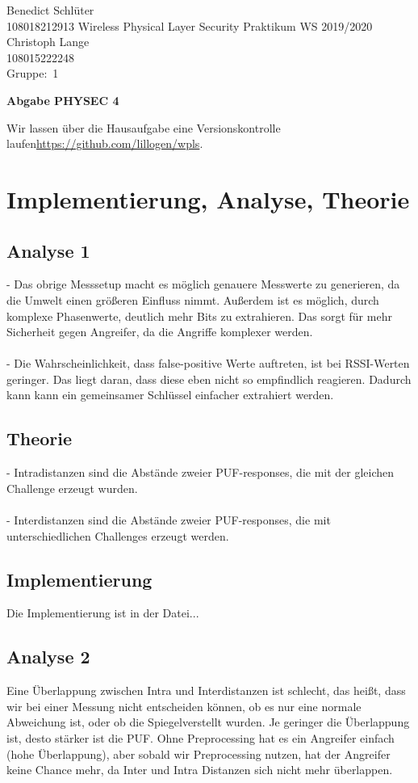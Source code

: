 \documentclass[12pt,a4paper]{article}
\newcommand{\student}{Benedict Schlüter\\ 108018212913 } %
\newcommand{\partner}{Christoph Lange\\ 108015222248} %
\newcommand{\group}{1} %
\newcommand{\hwheadtwo}{$ $
  \vspace{-2cm}
  
\noindent \student \qquad \qquad  Wireless Physical Layer Security Praktikum \hfill WS 2019/2020 \\
\noindent \partner \\
\noindent Gruppe:~\group\\
$ $

  
\begin{center}    
{\Large \bf Abgabe PHYSEC 4}
\end{center}
}
\begin{document}
\hwheadtwo
Wir lassen über die Hausaufgabe eine Versionskontrolle laufen\url{https://github.com/lillogen/wpls}.\\

\section{Implementierung, Analyse, Theorie}
\subsection*{Analyse 1}
- Das obrige Messsetup macht es möglich genauere Messwerte zu generieren, da die Umwelt einen größeren Einfluss nimmt. Außerdem ist es möglich, durch komplexe Phasenwerte, deutlich mehr Bits zu extrahieren. Das sorgt für mehr Sicherheit gegen Angreifer, da die Angriffe komplexer werden.\\\\
- Die Wahrscheinlichkeit, dass false-positive Werte auftreten, ist bei RSSI-Werten geringer. Das liegt daran, dass diese eben nicht so empfindlich reagieren. Dadurch kann kann ein gemeinsamer Schlüssel einfacher extrahiert werden. 
\subsection*{Theorie}
- Intradistanzen sind die Abstände zweier PUF-responses, die mit der gleichen Challenge erzeugt wurden.\\\\
- Interdistanzen sind die Abstände zweier PUF-responses, die mit unterschiedlichen Challenges erzeugt werden.
\subsection*{Implementierung}
Die Implementierung ist in der Datei...
\subsection*{Analyse 2}
Eine Überlappung zwischen Intra und Interdistanzen ist schlecht, das heißt, dass wir bei einer Messung nicht entscheiden können, ob es nur eine normale Abweichung ist, oder ob die Spiegelverstellt wurden.
Je geringer die Überlappung ist, desto stärker ist die PUF. 
Ohne Preprocessing hat es ein Angreifer einfach (hohe Überlappung), aber sobald wir Preprocessing nutzen, hat der Angreifer keine Chance mehr, da Inter und Intra Distanzen sich nicht mehr überlappen.
\newpage
\end{document}

